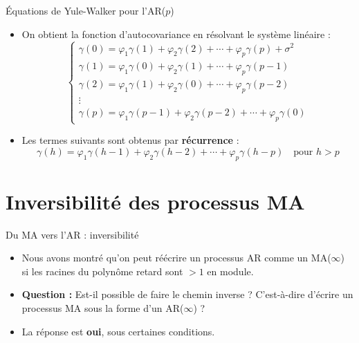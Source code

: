 \documentclass[11pt,aspectratio=169]{beamer}
\begin{document}
\begin{frame}{Équations de Yule-Walker pour l'AR($p$)}

\begin{itemize}

\item On obtient la fonction d'autocovariance en résolvant le système linéaire :
\[
\begin{cases}
\gamma(0) = \varphi_1 \gamma(1) + \varphi_2 \gamma(2) + \cdots + \varphi_p \gamma(p) + \sigma^2 \\
\gamma(1) = \varphi_1 \gamma(0) + \varphi_2 \gamma(1) + \cdots + \varphi_p \gamma(p-1) \\
\gamma(2) = \varphi_1 \gamma(1) + \varphi_2 \gamma(0) + \cdots + \varphi_p \gamma(p-2) \\
\vdots \\
\gamma(p) = \varphi_1 \gamma(p-1) + \varphi_2 \gamma(p-2) + \cdots + \varphi_p \gamma(0)
\end{cases}
\]

\item Les termes suivants sont obtenus par \textbf{récurrence} :
\[
\gamma(h) = \varphi_1 \gamma(h-1) + \varphi_2 \gamma(h-2) + \cdots + \varphi_p \gamma(h-p) \quad \text{pour } h > p
\]

\end{itemize}
\end{frame}

\section{Inversibilité des processus MA}

\begin{frame}{Du MA vers l'AR : inversibilité}

\begin{itemize}

\item Nous avons montré qu'on peut réécrire un processus AR comme un MA($\infty$) si les racines du polynôme retard sont $> 1$ en module.\newline

\item \textbf{Question :} Est-il possible de faire le chemin inverse ? C'est-à-dire d'écrire un processus MA sous la forme d'un AR($\infty$) ?\newline

\item La réponse est \textbf{oui}, sous certaines conditions.

\end{itemize}
\end{frame}
\end{document}
